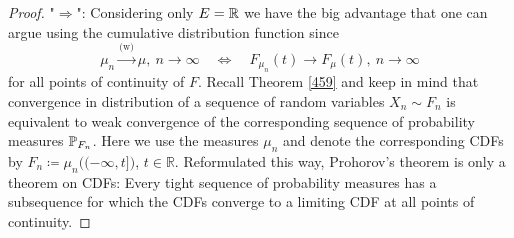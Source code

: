 \begin{proof}[Proof]
	"{}$\Rightarrow$": Considering only $E=\R$ we have the big advantage that one can argue using the cumulative distribution function since $$ \mu_n \overset{\text{(w)}}{\longrightarrow}\mu, \: n \to \infty \quad \Leftrightarrow \quad F_{\mu_n}(t) \to F_{\mu}(t), \: n\to\infty$$ for all points of continuity of $F$. Recall Theorem \ref{459} and keep in mind that convergence in distribution of a sequence of random variables $X_n\sim F_n$ is equivalent to weak convergence of the corresponding sequence of probability measures $\P_{F_n}$. Here we use the measures $\mu_n$ and denote the corresponding CDFs by $F_n \coloneqq \mu_n\big( ( -\infty,t]\big)$, $t\in \mathbb{R}$. Reformulated this way, Prohorov's theorem is only a theorem on CDFs: Every tight sequence of probability measures has a subsequence for which the CDFs converge to a limiting CDF at all points of continuity.\smallskip
	

\end{proof}
